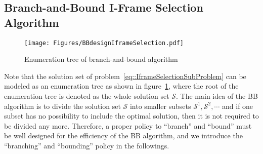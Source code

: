 \subsection{Branch-and-Bound I-Frame Selection Algorithm}
\label{sec::proposedBBAlg}
\begin{figure}
\begin{center}
\texttt{[image: Figures/BBdesignIframeSelection.pdf]}
\caption{\label{fig::BBdesgin}Enumeration tree of branch-and-bound algorithm}
\end{center}
\end{figure}
Note that the solution set of problem~\eqref{eq::IframeSelectionSubProblem} can be modeled as an enumeration tree as shown in figure~\ref{fig::BBdesgin}, where the root of the enumeration tree is denoted as the whole solution set $\mathcal{S}$.
The main idea of the BB algorithm is to divide the solution set $\mathcal{S}$ into smaller subsets $\mathcal{S}^1, \mathcal{S}^2, \cdots$ and if one subset has no possibility to include the optimal solution, then it is not required to be divided any more.
Therefore, a proper policy to ``branch'' and ``bound'' must be well designed for the efficiency of the BB algorithm, and we introduce the ``branching'' and ``bounding'' policy in the followings.
%
